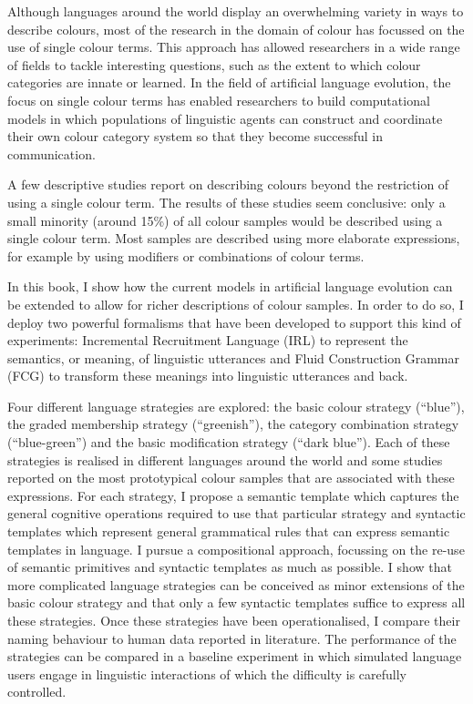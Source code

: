 
Although languages around the world display an overwhelming variety in
ways to describe colours, most of the research in the domain of colour
has focussed on the use of single colour terms. This approach has
allowed researchers in a wide range of fields to tackle interesting
questions, such as the extent to which colour categories are innate or
learned. In the field of artificial language evolution, the focus on
single colour terms has enabled researchers to build computational
models in which populations of linguistic agents can construct and
coordinate their own colour category system so that they become
successful in communication.

A few descriptive studies report on describing colours beyond the
restriction of using a single colour term. The results of these
studies seem conclusive: only a small minority (around 15\%) of all
colour samples would be described using a single colour term. Most
samples are described using more elaborate expressions, for example by
using modifiers or combinations of colour terms.

In this book, I show how the current models in artificial language
evolution can be extended to allow for richer descriptions of colour
samples. In order to do so, I deploy two powerful formalisms that have
been developed to support this kind of experiments: Incremental
Recruitment Language (IRL) to represent the semantics, or meaning, of
linguistic utterances and Fluid Construction Grammar (FCG) to
transform these meanings into linguistic utterances and back.

Four different language strategies are explored: the basic colour
strategy (``blue''), the graded membership strategy (``greenish''),
the category combination strategy (``blue-green'') and the basic
modification strategy (``dark blue''). Each of these strategies is
realised in different languages around the world and some studies
reported on the most prototypical colour samples that are associated
with these expressions. For each strategy, I propose a semantic
template which captures the general cognitive operations required to
use that particular strategy and syntactic templates which represent
general grammatical rules that can express semantic templates in
language. I pursue a compositional approach, focussing on the re-use
of semantic primitives and syntactic templates as much as possible. I
show that more complicated language strategies can be conceived as
minor extensions of the basic colour strategy and that only a few
syntactic templates suffice to express all these strategies. Once
these strategies have been operationalised, I compare their naming
behaviour to human data reported in literature. The performance of the
strategies can be compared in a baseline experiment in which simulated
language users engage in linguistic interactions of which the
difficulty is carefully controlled.

